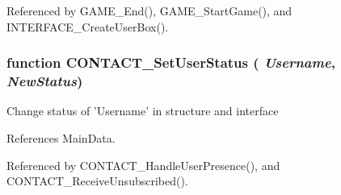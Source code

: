 Referenced by GAME\_\-End(), GAME\_\-StartGame(), and INTERFACE\_\-CreateUserBox().
\subsubsection{\setlength{\rightskip}{0pt plus 5cm}function CONTACT\_\-SetUserStatus ( {\em Username}, \/   {\em NewStatus})}\label{status_8js_7682d4a0f76bd4f6c8cd0be463dbf461}


Change status of 'Username' in structure and interface 

References MainData.

Referenced by CONTACT\_\-HandleUserPresence(), and CONTACT\_\-ReceiveUnsubscribed().